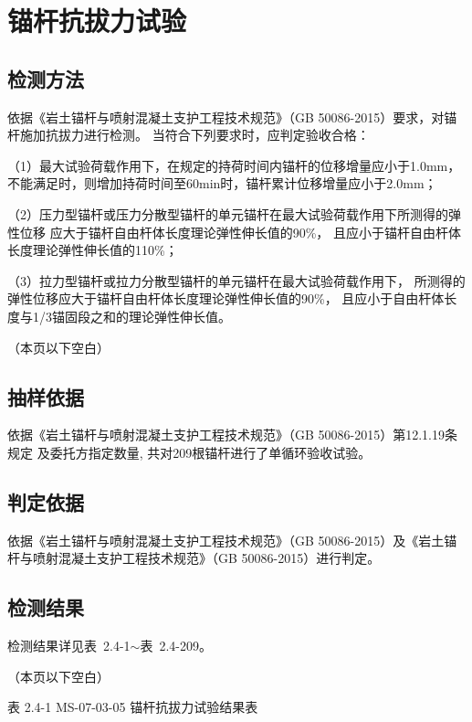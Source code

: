 \documentclass[11pt, a4paper, UTF8]{ctexart}
\newcommand{\InspItem}{锚杆抗拔力试验}
\newcommand{\MethodBasis}{《岩土锚杆与喷射混凝土支护工程技术规范》（GB 50086-2015）}
\newcommand{\JudgeBasis}{《岩土锚杆与喷射混凝土支护工程技术规范》（GB 50086-2015）}
\newcommand{\InspEnv}{/}
\newcommand{\MethodDesc}{ %

    依据\MethodBasis{}要求，对锚杆施加抗拔力进行检测。
    当符合下列要求时，应判定验收合格：

    （1）最大试验荷载作用下，在规定的持荷时间内锚杆的位移增量应小于1.0mm，
    不能满足时，则增加持荷时间至60min时，锚杆累计位移增量应小于2.0mm；

    （2）压力型锚杆或压力分散型锚杆的单元锚杆在最大试验荷载作用下所测得的弹性位移
    应大于锚杆自由杆体长度理论弹性伸长值的90\%，
    且应小于锚杆自由杆体长度理论弹性伸长值的110\%；

    （3）拉力型锚杆或拉力分散型锚杆的单元锚杆在最大试验荷载作用下，
    所测得的弹性位移应大于锚杆自由杆体长度理论弹性伸长值的90\%，
    且应小于自由杆体长度与1/3锚固段之和的理论弹性伸长值。%

}
\newcommand{\SamplingBasis}{

    依据《岩土锚杆与喷射混凝土支护工程技术规范》（GB 50086-2015）第12.1.19条规定
    及委托方指定数量,
    共对209根锚杆进行了单循环验收试验。

}
\begin{document}



\section{\InspItem}

\subsection{检测方法}

\MethodDesc{}

（本页以下空白）

\subsection{抽样依据}

\SamplingBasis{}

\subsection{判定依据}

\hspace*{2\ccwd}依据\JudgeBasis{}及\MethodBasis{}进行判定。

\subsection{检测结果}

检测结果详见表~2.4-1$\sim$表~2.4-209。

（本页以下空白）

\clearpage

\begin{center}
{ 表 2.4-1 \quad MS-07-03-05 锚杆抗拔力试验结果表}
\end{center}
\end{document}
